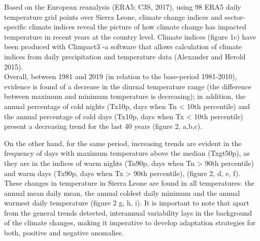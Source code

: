 \documentclass[
]{book}
\begin{document}
Based on the European reanalysis (ERA5; C3S, 2017), using 98 ERA5 daily temperature grid points over Sierra Leone, climate change indices and sector-specific climate indices reveal the picture of how climate change has impacted temperature in recent years at the country level. Climate indices (figure 1c) have been produced with Climpact3 -a software that allows calculation of climate indices from daily precipitation and temperature data (Alexander and Herold 2015).\\
Overall, between 1981 and 2019 (in relation to the base-period 1981-2010), evidence is found of a decrease in the diurnal temperature range (the difference between maximum and minimum temperature is decreasing); in addition, the annual percentage of cold nights (Tx10p, days when Tn \textless{} 10th percentile) and the annual percentage of cold days (Tx10p, days when Tx \textless{} 10th percentile) present a decreasing trend for the last 40 years (figure 2, a,b,c).

On the other hand, for the same period, increasing trends are evident in the frequency of days with maximum temperature above the median (Txgt50p), as they are in the indices of warm nights (Tn90p, days when Tn \textgreater{} 90th percentile) and warm days (Tx90p, days when Tx \textgreater{} 90th percentile), (figure 2, d, e, f). These changes in temperature in Sierra Leone are found in all temperatures: the annual mean daily mean, the annual coldest daily minimum and the annual warmest daily temperature (figure 2 g, h, i). It is important to note that apart from the general trends detected, interannual variability lays in the background of the climate changes, making it imperative to develop adaptation strategies for both, positive and negative anomalies.
\end{document}
